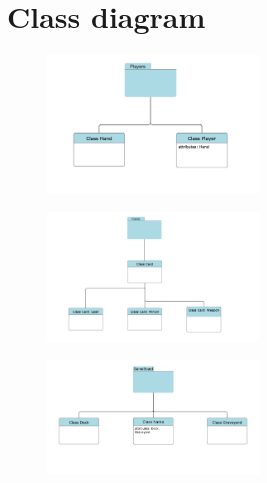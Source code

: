 \documentclass[12pt,a4paper]{article}
\begin{document}
\section{Class diagram}
\begin{figure}[h]
\centering 
\includegraphics[width=0.5\textwidth]{img/1.png}
\end{figure}
\begin{figure}[h]
\centering 
\includegraphics[width=0.5\textwidth]{img/2.png}
\end{figure}
\begin{figure}[h]
\centering 
\includegraphics[width=0.5\textwidth]{img/3.png}
\end{figure}
\end{document}
